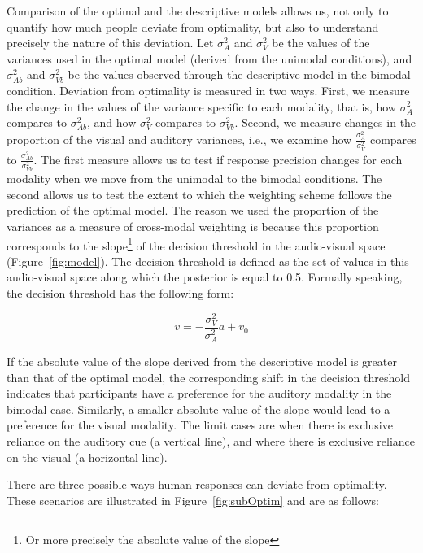 \documentclass[english,floatsintext,man]{apa6}
\theoremstyle{definition}
\theoremstyle{definition}
\theoremstyle{definition}
\theoremstyle{remark}
\begin{document}
Comparison of the optimal and the descriptive models allows us, not only
to quantify how much people deviate from optimality, but also to
understand precisely the nature of this deviation. Let \(\sigma^2_{A}\)
and \(\sigma^2_{V}\) be the values of the variances used in the optimal
model (derived from the unimodal conditions), and \(\sigma^2_{Ab}\) and
\(\sigma^2_{Vb}\) be the values observed through the descriptive model
in the bimodal condition. Deviation from optimality is measured in two
ways. First, we measure the change in the values of the variance
specific to each modality, that is, how \(\sigma^2_{A}\) compares to
\(\sigma^2_{Ab}\), and how \(\sigma^2_{V}\) compares to
\(\sigma^2_{Vb}\). Second, we measure changes in the proportion of the
visual and auditory variances, i.e., we examine how
\(\frac{\sigma^2_{A}}{\sigma^2_{V}}\) compares to
\(\frac{\sigma^2_{Ab}}{\sigma^2_{Vb}}\). The first measure allows us to
test if response precision changes for each modality when we move from
the unimodal to the bimodal conditions. The second allows us to test the
extent to which the weighting scheme follows the prediction of the
optimal model. The reason we used the proportion of the variances as a
measure of cross-modal weighting is because this proportion corresponds
to the slope\footnote{Or more precisely the absolute value of the slope}
of the decision threshold in the audio-visual space
(Figure~\ref{fig:model}). The decision threshold is defined as the set
of values in this audio-visual space along which the posterior is equal
to 0.5. Formally speaking, the decision threshold has the following
form:

\[v=-\frac{\sigma^2_V}{\sigma^2_A}a+v_0\]

If the absolute value of the slope derived from the descriptive model is
greater than that of the optimal model, the corresponding shift in the
decision threshold indicates that participants have a preference for the
auditory modality in the bimodal case. Similarly, a smaller absolute
value of the slope would lead to a preference for the visual modality.
The limit cases are when there is exclusive reliance on the auditory cue
(a vertical line), and where there is exclusive reliance on the visual
(a horizontal line).

There are three possible ways human responses can deviate from
optimality. These scenarios are illustrated in Figure~\ref{fig:subOptim}
and are as follows:
\end{document}
